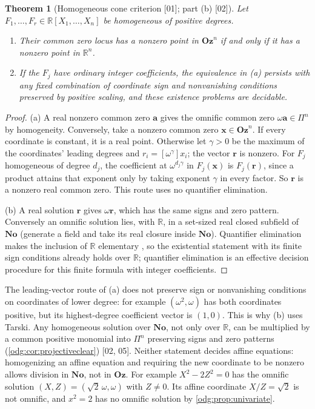 \documentclass[11pt,oneside]{article}
\numberwithin{equation}{section}
\newtheorem{theorem}{Theorem}[section]
\theoremstyle{definition}
\theoremstyle{remark}
\newcommand{\No}{\mathbf{No}}
\newcommand{\Oz}{\mathbf{Oz}}
\newcommand{\R}{\mathbb R}
\newcommand{\src}[1]{\textup{\textsf{\small[#1]}}}
\begin{document}
\begin{theorem}[Homogeneous cone criterion \src{01}; part (b) \src{02}]\label{odg:thm:cone}
Let $F_1,\ldots,F_r\in\R[X_1,\ldots,X_n]$ be homogeneous of positive
degrees.
\begin{enumerate}[label=\textup{(\alph*)},leftmargin=*]
\item Their common zero locus has a nonzero point in $\Oz^n$ if and only
if it has a nonzero point in $\R^n$.
\item If the $F_j$ have ordinary integer coefficients, the
equivalence in (a) persists with any fixed combination of coordinate sign and
nonvanishing conditions preserved by positive scaling, and these existence
problems are decidable.
\end{enumerate}
\end{theorem}
\begin{proof}
(a) A real nonzero common zero $\mathbf a$ gives the omnific common zero
$\omega\mathbf a\in\Pi^n$ by homogeneity. Conversely, take a nonzero common
zero $\mathbf x\in\Oz^n$. If every coordinate is constant, it is a real
point. Otherwise let $\gamma>0$ be the maximum of the coordinates' leading
degrees and $r_i=[\omega^\gamma]x_i$; the vector $\mathbf r$ is nonzero. For
$F_j$ homogeneous of degree $d_j$, the coefficient at $\omega^{d_j\gamma}$
in $F_j(\mathbf x)$ is $F_j(\mathbf r)$, since a product attains that exponent
only by taking exponent $\gamma$ in every factor. So $\mathbf r$ is a nonzero
real common zero. This route uses no quantifier elimination.

(b) A real solution $\mathbf r$ gives $\omega\mathbf r$, which has the same
signs and zero pattern. Conversely an omnific solution lies, with $\R$, in a
set-sized real closed subfield of $\No$ (generate a field and take its real
closure inside $\No$). Quantifier elimination makes the inclusion of $\R$
elementary \cite{Tarski}, so the existential statement with its finite sign
conditions already holds over $\R$; quantifier elimination is an effective
decision procedure for this finite formula with integer coefficients.
\end{proof}

The leading-vector route of (a) does not preserve sign or nonvanishing
conditions on coordinates of lower degree: for example $(\omega^2,\omega)$
has both coordinates positive, but its highest-degree coefficient vector
is $(1,0)$. This is why (b) uses Tarski. Any
homogeneous solution over $\No$, not only over $\R$, can be multiplied by a
common positive monomial into $\Pi^n$ preserving signs and zero patterns
(\cref{odg:cor:projectiveclear}) \src{02, 05}. Neither statement decides
affine equations: homogenizing an affine equation and requiring the new
coordinate to be nonzero allows division in $\No$, not in $\Oz$.
For example $X^2-2Z^2=0$ has the omnific solution
$(X,Z)=(\sqrt2\,\omega,\omega)$ with $Z\ne0$. Its affine coordinate
$X/Z=\sqrt2$ is not omnific, and $x^2=2$ has no omnific solution by
\cref{odg:prop:univariate}.
\end{document}
